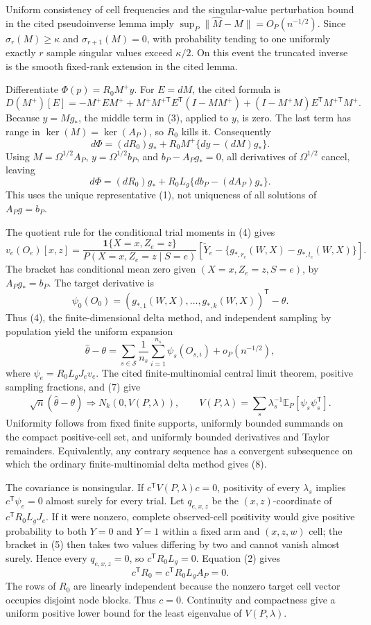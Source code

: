 Uniform consistency of cell frequencies and the singular-value perturbation bound in the cited pseudoinverse lemma imply \(\sup_P\|\widehat M-M\|=O_P(n^{-1/2})\).  Since \(\sigma_r(M)\ge\kappa\) and \(\sigma_{r+1}(M)=0\), with probability tending to one uniformly exactly \(r\) sample singular values exceed \(\kappa/2\).  On this event the truncated inverse is the smooth fixed-rank extension in the cited lemma.

Differentiate \(\Phi(p)=R_0M^+y\).  For \(E=dM\), the cited formula is
\[
D(M^+)[E]=-M^+EM^++M^+M^{+\mathsf T}E^{\mathsf T}(I-MM^+)
+(I-M^+M)E^{\mathsf T}M^{+\mathsf T}M^+.
\tag{3}
\]
Because \(y=Mg_*\), the middle term in (3), applied to \(y\), is zero.  The last term has range in \(\ker(M)=\ker(A_P)\), so \(R_0\) kills it.  Consequently
\[
d\Phi=(dR_0)g_*+R_0M^+\{dy-(dM)g_*\}.
\]
Using \(M=\Omega^{1/2}A_P\), \(y=\Omega^{1/2}b_P\), and \(b_P-A_Pg_*=0\), all derivatives of \(\Omega^{1/2}\) cancel, leaving
\[
d\Phi=(dR_0)g_*+R_0L_g\{db_P-(dA_P)g_*\}.
\tag{4}
\]
This uses the unique representative (1), not uniqueness of all solutions of \(A_Pg=b_P\).

The quotient rule for the conditional trial moments in (4) gives
\[
v_e(O_e)[x,z]=
\frac{\mathbf 1\{X=x,Z_e=z\}}{P(X=x,Z_e=z\mid S=e)}
\left[\widetilde Y_e-\{g_{*,r_e}(W,X)-g_{*,l_e}(W,X)\}\right].
\tag{5}
\]
The bracket has conditional mean zero given \((X=x,Z_e=z,S=e)\), by \(A_Pg_*=b_P\).  The target derivative is
\[
\psi_0(O_0)=
(g_{*,1}(W,X),\ldots,g_{*,k}(W,X))^{\mathsf T}-\theta.
\tag{6}
\]
Thus (4), the finite-dimensional delta method, and independent sampling by population yield the uniform expansion
\[
\widehat\theta-\theta
=\sum_{s\in\mathcal S}\frac1{n_s}\sum_{i=1}^{n_s}\psi_s(O_{s,i})
+o_P(n^{-1/2}),
\tag{7}
\]
where \(\psi_e=R_0L_gJ_ev_e\).  The cited finite-multinomial central limit theorem, positive sampling fractions, and (7) give
\[
\sqrt n(\widehat\theta-\theta)\Longrightarrow
N_k(0,V(P,\lambda)),
\qquad
V(P,\lambda)=\sum_s\lambda_s^{-1}\mathbb E_P[\psi_s\psi_s^{\mathsf T}].
\tag{8}
\]
Uniformity follows from fixed finite supports, uniformly bounded summands on the compact positive-cell set, and uniformly bounded derivatives and Taylor remainders.  Equivalently, any contrary sequence has a convergent subsequence on which the ordinary finite-multinomial delta method gives (8).

The covariance is nonsingular.  If \(c^{\mathsf T}V(P,\lambda)c=0\), positivity of every \(\lambda_s\) implies \(c^{\mathsf T}\psi_e=0\) almost surely for every trial.  Let \(q_{e,x,z}\) be the \((x,z)\)-coordinate of \(c^{\mathsf T}R_0L_gJ_e\).  If it were nonzero, complete observed-cell positivity would give positive probability to both \(Y=0\) and \(Y=1\) within a fixed arm and \((x,z,w)\) cell; the bracket in (5) then takes two values differing by two and cannot vanish almost surely.  Hence every \(q_{e,x,z}=0\), so \(c^{\mathsf T}R_0L_g=0\).  Equation (2) gives
\[
c^{\mathsf T}R_0=c^{\mathsf T}R_0L_gA_P=0.
\]
The rows of \(R_0\) are linearly independent because the nonzero target cell vector occupies disjoint node blocks.  Thus \(c=0\).  Continuity and compactness give a uniform positive lower bound for the least eigenvalue of \(V(P,\lambda)\).

